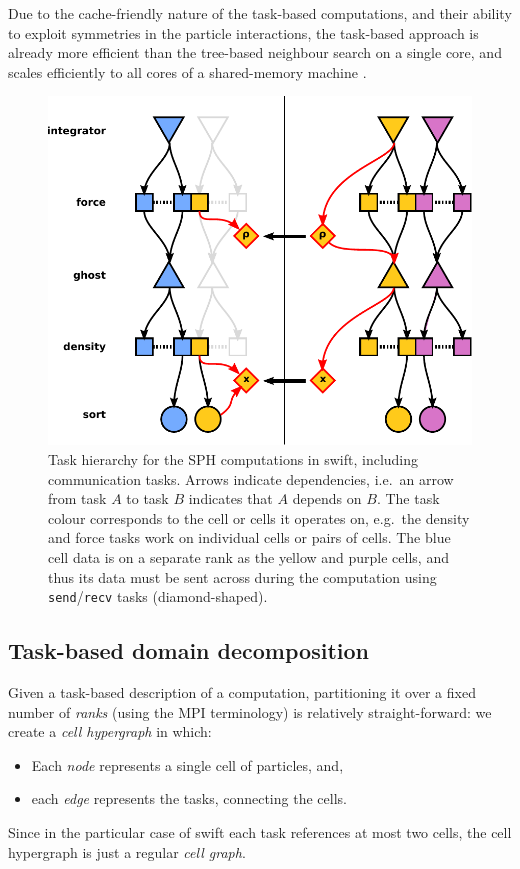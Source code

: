 \documentclass{sig-alternate-05-2015}
\newcommand{\swift}{{\sc swift}\xspace}
\begin{document}
Due to the cache-friendly nature of the task-based computations, 
and their ability to exploit symmetries in the particle interactions,
the task-based approach is already more efficient than the tree-based
neighbour search on a single core, and scales efficiently to all
cores of a shared-memory machine \cite{gonnet2015efficient}.

\begin{figure}
\centering
\includegraphics[width=\columnwidth]{Figures/Hierarchy3}
\caption{Task hierarchy for the SPH computations in \swift,
  including communication tasks. Arrows indicate dependencies,
  i.e.~an arrow from task $A$ to task $B$ indicates that $A$
  depends on $B$. The task colour corresponds to the cell or
  cells it operates on, e.g.~the density and force tasks work
  on individual cells or pairs of cells.
  The blue cell data is on a separate rank as the yellow and
  purple cells, and thus its data must be sent across during
  the computation using {\tt send}/{\tt recv} tasks (diamond-shaped).}
\label{tasks}
\end{figure}  


\subsection{Task-based domain decomposition}

Given a task-based description of a computation, partitioning it over
a fixed number of {\em ranks} (using the MPI terminology)
is relatively straight-forward: we create
a {\em cell hypergraph} in which:
\begin{itemize}
  \item Each {\em node} represents a single cell of particles, and,
  \item each {\em edge} represents the tasks, connecting the
    cells.
\end{itemize}
Since in the particular case of \swift each task references at most
two cells, the cell hypergraph is just a regular {\em cell graph}.
\end{document}
